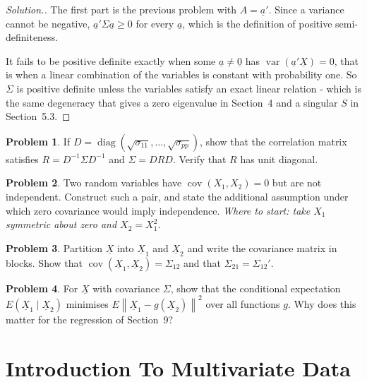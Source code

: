 \documentclass[11pt,a4paper]{article}
\theoremstyle{definition}
\newtheorem{problemx}{Problem}[section]
\newenvironment{problem}{\begin{problemx}}{\end{problemx}}
\newenvironment{solution}
  {\renewcommand{\qedsymbol}{}\begin{proof}[\textit{Solution}.]}
  {\end{proof}}
\begin{document}
\begin{solution}
The first part is the previous problem with $A = \underline{a}'$. Since a
variance cannot be negative, $\underline{a}'\Sigma\underline{a}\geq0$ for every
$\underline{a}$, which is the definition of positive semi-definiteness.

It fails to be positive definite exactly when some
$\underline{a}\neq\underline{0}$ has
$\operatorname{var}(\underline{a}'\underline{X}) = 0$, that is when a linear
combination of the variables is constant with probability one. So $\Sigma$ is
positive definite unless the variables satisfy an exact linear relation - which
is the same degeneracy that gives a zero eigenvalue in Section~4 and a singular
$S$ in Section~5.3.
\end{solution}

\begin{problem}
If $D = \operatorname{diag}\left(\sqrt{\sigma_{11}},\ldots,\sqrt{\sigma_{pp}}\right)$,
show that the correlation matrix satisfies $R = D^{-1}\Sigma D^{-1}$ and
$\Sigma = DRD$. Verify that $R$ has unit diagonal.
\end{problem}

\begin{problem}
Two random variables have $\operatorname{cov}(X_1,X_2)=0$ but are not
independent. Construct such a pair, and state the additional assumption under
which zero covariance would imply independence.
\emph{Where to start: take $X_1$ symmetric about zero and $X_2 = X_1^{2}$.}
\end{problem}

\begin{problem}
Partition $\underline{X}$ into $\underline{X}_1$ and $\underline{X}_2$ and
write the covariance matrix in blocks. Show that
$\operatorname{cov}\left(\underline{X}_1,\underline{X}_2\right) = \Sigma_{12}$
and that $\Sigma_{21} = \Sigma_{12}'$.
\end{problem}

\begin{problem}
For $\underline{X}$ with covariance $\Sigma$, show that the conditional
expectation $E\left(\underline{X}_1\mid\underline{X}_2\right)$ minimises
$E\left\|\underline{X}_1-g(\underline{X}_2)\right\|^{2}$ over all functions $g$.
Why does this matter for the regression of Section~9?
\end{problem}

\section{Introduction To Multivariate Data}
\end{document}
